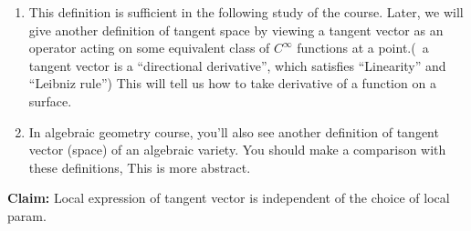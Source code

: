 \begin{remark}
    \hfill
    \begin{enumerate}[(1)]
        \item This definition is sufficient in the following study of the
              course. Later, we will give another definition of tangent space
              by viewing a tangent vector as an operator acting on some equivalent
              class of \(C^\infty\) functions at a point.(\ie\ a tangent vector
              is a ``directional derivative'', which satisfies ``Linearity'' and
              ``Leibniz rule'') This will tell us how to take derivative of a
              function on a surface.
        \item In algebraic geometry course, you'll also see another
              definition of tangent vector (space) of an algebraic variety.
              You should make a comparison with these definitions, This is
              more abstract.
    \end{enumerate}
\end{remark}
\textbf{Claim:} Local expression of tangent vector is independent of the choice of
local param.
